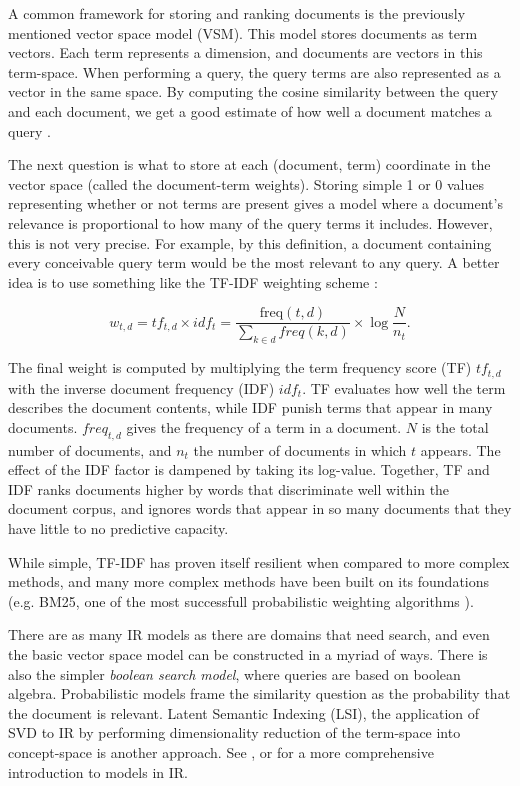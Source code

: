 A common framework for storing and ranking documents is the previously mentioned vector space model (VSM).
This model stores documents as term vectors. Each term represents a dimension, and documents are
vectors in this term-space. When performing a query, the query terms are also represented as a vector
in the same space. By computing the cosine similarity between the query and each document,
we get a good estimate of how well a document matches a query \citep[p29]{Baeza-Yates1999}.

The next question is what to store at each (document, term) coordinate in the vector space
(called the document-term weights).
Storing simple 1 or 0 values representing whether or not terms are present gives a model 
where a document's relevance is proportional to how 
many of the query terms it includes. However, this is not very precise. 
For example, by this definition, a document containing every conceivable query term
would be the most relevant to any query.
A better idea is to use something like the TF-IDF weighting scheme \citep[p29]{Baeza-Yates1999}:

\begin{equation*}
  w_{t,d} = tf_{t,d} \times idf_{t}
          = \frac{ \mathrm{freq}(t,d) }{ \sum_{k \in d} freq(k,d) } \times 
            \log \frac{N}{n_{t}}.
\end{equation*}

The final weight is computed by multiplying the term frequency score (TF) $tf_{t,d}$ with the 
inverse document frequency (IDF) $idf_{t}$. TF evaluates how well the term describes the document contents,
while IDF punish terms that appear in many documents. 
$freq_{t,d}$ gives the frequency of a term in a document. $N$ is the total number of documents,
and $n_{t}$ the number of documents in which $t$ appears. The effect of the IDF factor is dampened by taking its
log-value. Together, TF and IDF ranks documents higher by words that discriminate well within the document corpus,
and ignores words that appear in so many documents that they have little to no predictive capacity.

While simple, TF-IDF has proven itself resilient when compared to more complex methods,
and many more complex methods have been built on its foundations (e.g. BM25, one of the most successfull
probabilistic weighting algorithms \citep{Robertson2010}).

There are as many IR models as there are domains that need search,
and even the basic vector space model can be constructed in a myriad of ways. There is also the simpler 
\emph{boolean search model}, where queries are based on boolean algebra. Probabilistic models
frame the similarity question as the probability that the document is relevant. 
Latent Semantic Indexing (LSI), the application of SVD to IR by performing dimensionality reduction of the term-space
into concept-space is another approach.
See \cite{Manning2008}, \cite{Robertson2010} or \cite{Baeza-Yates1999} for a more comprehensive introduction to models in IR.


